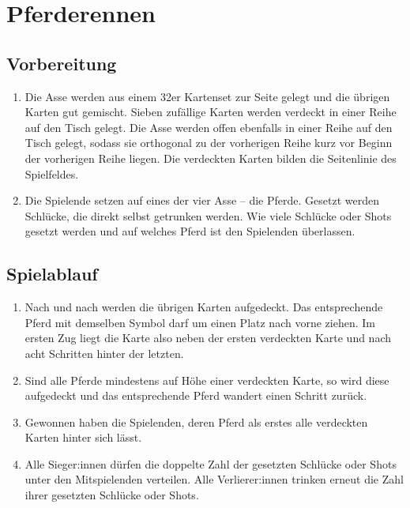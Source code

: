 \chapter{Pferderennen}
\section{Vorbereitung}
\begin{enumerate}[label={(\arabic*)}]    
    \item
    Die Asse werden aus einem 32er Kartenset zur Seite gelegt und die übrigen Karten gut gemischt.
    Sieben zufällige Karten werden verdeckt in einer Reihe auf den Tisch gelegt.
    Die Asse werden offen ebenfalls in einer Reihe auf den Tisch gelegt, sodass sie orthogonal zu der vorherigen Reihe kurz vor Beginn der vorherigen Reihe liegen.
    Die verdeckten Karten bilden die Seitenlinie des Spielfeldes.

    \item
    Die Spielende setzen auf eines der vier Asse – die \glqq{} Pferde\grqq{}.
    Gesetzt werden Schlücke, die direkt selbst getrunken werden.
    Wie viele Schlücke oder Shots gesetzt werden und auf welches Pferd ist den Spielenden überlassen.
\end{enumerate}

\section{Spielablauf}
\begin{enumerate}[label={(\arabic*)}]
    \item
    Nach und nach werden die übrigen Karten aufgedeckt.
    Das entsprechende Pferd mit demselben Symbol darf um einen Platz nach vorne ziehen.
    Im ersten Zug liegt die Karte also neben der ersten verdeckten Karte und nach acht Schritten hinter der letzten.

    \item
    Sind alle Pferde mindestens auf Höhe einer verdeckten Karte, so wird diese aufgedeckt und das entsprechende Pferd wandert einen Schritt zurück.

    \item
    Gewonnen haben die Spielenden, deren Pferd als erstes alle verdeckten Karten hinter sich lässt.

    \item
    Alle Sieger:innen dürfen die doppelte Zahl der gesetzten Schlücke oder Shots unter den Mitspielenden verteilen.
    Alle Verlierer:innen trinken erneut die Zahl ihrer gesetzten Schlücke oder Shots.
\end{enumerate}
